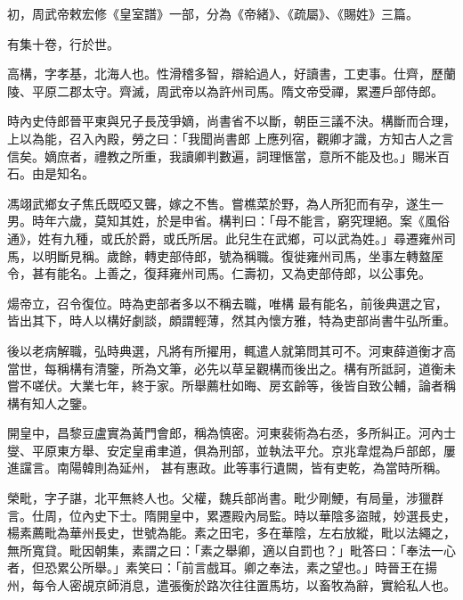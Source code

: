 \begin{pinyinscope}
 初，周武帝敕宏修《皇室譜》一部，分為《帝緒》、《疏屬》、《賜姓》三篇。



 有集十卷，行於世。



 高構，字孝基，北海人也。性滑稽多智，辯給過人，好讀書，工吏事。仕齊，歷蘭陵、平原二郡太守。齊滅，周武帝以為許州司馬。隋文帝受禪，累遷戶部侍郎。



 時內史侍郎晉平東與兄子長茂爭嫡，尚書省不以斷，朝臣三議不決。構斷而合理，上以為能，召入內殿，勞之曰：「我聞尚書郎
 上應列宿，觀卿才識，方知古人之言信矣。嫡庶者，禮教之所重，我讀卿判數遍，詞理愜當，意所不能及也。」賜米百石。由是知名。



 馮翊武鄉女子焦氏既啞又聾，嫁之不售。嘗樵菜於野，為人所犯而有孕，遂生一男。時年六歲，莫知其姓，於是申省。構判曰：「母不能言，窮究理絕。案《風俗通》，姓有九種，或氏於爵，或氏所居。此兒生在武鄉，可以武為姓。」尋遷雍州司馬，以明斷見稱。歲餘，轉吏部侍郎，號為稱職。復徙雍州司馬，坐事左轉盩厔令，甚有能名。上善之，復拜雍州司馬。仁壽初，又為吏部侍郎，以公事免。



 煬帝立，召令復位。時為吏部者多以不稱去職，唯構
 最有能名，前後典選之官，皆出其下，時人以構好劇談，頗謂輕薄，然其內懷方雅，特為吏部尚書牛弘所重。



 後以老病解職，弘時典選，凡將有所擢用，輒遣人就第問其可不。河東薛道衡才高當世，每稱構有清鑒，所為文筆，必先以草呈觀構而後出之。構有所詆訶，道衡未嘗不嗟伏。大業七年，終于家。所舉薦杜如晦、房玄齡等，後皆自致公輔，論者稱構有知人之鑒。



 開皇中，昌黎豆盧實為黃門會郎，稱為慎密。河東裴術為右丞，多所糾正。河內士燮、平原東方舉、安定皇甫聿道，俱為刑部，並執法平允。京兆韋焜為戶部郎，屢進讜言。南陽韓則為延州，
 甚有惠政。此等事行遺闕，皆有吏乾，為當時所稱。



 榮毗，字子諶，北平無終人也。父權，魏兵部尚書。毗少剛鯁，有局量，涉獵群言。仕周，位內史下士。隋開皇中，累遷殿內局監。時以華陰多盜賊，妙選長史，楊素薦毗為華州長史，世號為能。素之田宅，多在華陰，左右放縱，毗以法繩之，無所寬貸。毗因朝集，素謂之曰：「素之舉卿，適以自罰也？」毗答曰：「奉法一心者，但恐累公所舉。」素笑曰：「前言戲耳。卿之奉法，素之望也。」時晉王在揚州，每令人密覘京師消息，遣張衡於路次往往置馬坊，以畜牧為辭，實給私人也。




\end{pinyinscope}
